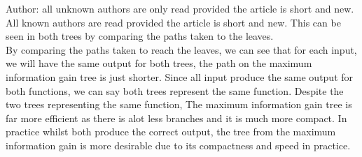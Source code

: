 \documentclass{article}
\begin{document}
\begin{enumerate}[(a)]
Author: all unknown authors are only read provided the article is short and new. All known authors are read provided the article is short and new. This can be seen in both trees by comparing the paths taken to the leaves.\\

By comparing the paths taken to reach the leaves, we can see that for each input, we will have the same output for both trees, the path on the maximum information gain tree is just shorter. Since all input produce the same output for both functions, we can say both trees represent the same function. Despite the two trees representing the same function, The maximum information gain tree is far more efficient as there is alot less branches and it is much more compact. In practice whilst both produce the correct output, the tree from the maximum information gain is more desirable due to its compactness and speed in practice. \\


\end{enumerate}
\end{document}
